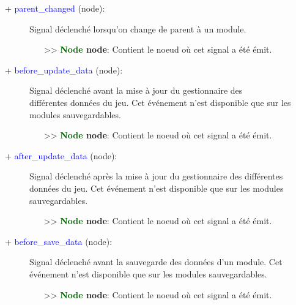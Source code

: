 \documentclass[a4paper, 11pt]{article}
\begin{document}
	\begin{description}
		\item [+ \textcolor{blue}{parent\_changed} (node):] Signal déclenché lorsqu'on change de parent à un 
		module.
		\begin{itemize}
			\item [>> \textbf{\textcolor{darkgreen}{Node} node}:] Contient le noeud où cet signal a été 
			émit.\\
		\end{itemize}
	\end{description}
	\begin{description}
		\item [+ \textcolor{blue}{before\_update\_data} (node):] Signal déclenché avant la mise à jour du 
		gestionnaire des \\différentes données du jeu. Cet événement n'est disponible que sur les modules 
		sauvegardables.
		\begin{itemize}
			\item [>> \textbf{\textcolor{darkgreen}{Node} node}:] Contient le noeud où cet signal a été 
			émit.\\
		\end{itemize}
	\end{description}
	\begin{description}
		\item [+ \textcolor{blue}{after\_update\_data} (node):] Signal déclenché après la mise à jour du 
		gestionnaire des différentes données du jeu. Cet événement n'est disponible que sur les modules 
		sauvegardables.
		\begin{itemize}
			\item [>> \textbf{\textcolor{darkgreen}{Node} node}:] Contient le noeud où cet signal a été 
			émit.\\
		\end{itemize}
	\end{description}
	\begin{description}
		\item [+ \textcolor{blue}{before\_save\_data} (node):] Signal déclenché avant la sauvegarde des 
		données d'un module. Cet événement n'est disponible que sur les modules sauvegardables.
		\begin{itemize}
			\item [>> \textbf{\textcolor{darkgreen}{Node} node}:] Contient le noeud où cet signal a été 
			émit.\\
		\end{itemize}
	\end{description}
\end{document}
